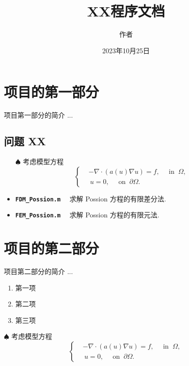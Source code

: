 \documentclass[11pt]{article}
\title{XX程序文档}
\author{作者}
\date{2023年10月25日}
\numberwithin{equation}{section}
\newcommand{\textcode}[1]{\textcolor{winered}{\bfseries\texttt{#1}}~~}
\begin{document}
\maketitle


\section{项目的第一部分}

项目第一部分的简介 ...

\subsection{问题 XX}

\begin{itemize}
\setlength{\itemsep}{3pt}
\item [$\spadesuit$] 考虑模型方程
\begin{equation}\label{eq:NLPossion}
\left\{
\begin{aligned}
&-\nabla \cdot(a(u) \nabla u) = f,\quad \text{ in } ~\Omega, \\
&~u = 0, \quad \text{ on } ~ \partial \Omega.
\end{aligned}\right.
\end{equation}

\item \textcode{FDM\_Possion.m} 求解 Possion 方程的有限差分法.

\item \textcode{FEM\_Possion.m} 求解 Possion 方程的有限元法.
\end{itemize}


\section{项目的第二部分}

项目第二部分的简介 ...

\begin{enumerate}
\setlength{\itemsep}{3pt}
  \item 第一项
  \item 第二项
  \item 第三项
\end{enumerate}



\medskip
\noindent $\spadesuit$ 考虑模型方程
\begin{equation}\label{eq:NLPossion2}
\left\{
\begin{aligned}
&-\nabla \cdot(a(u) \nabla u) = f,\quad \text{ in } ~\Omega, \\
&~u = 0, \quad \text{ on } ~ \partial \Omega.
\end{aligned}\right.
\end{equation}
\end{document}
